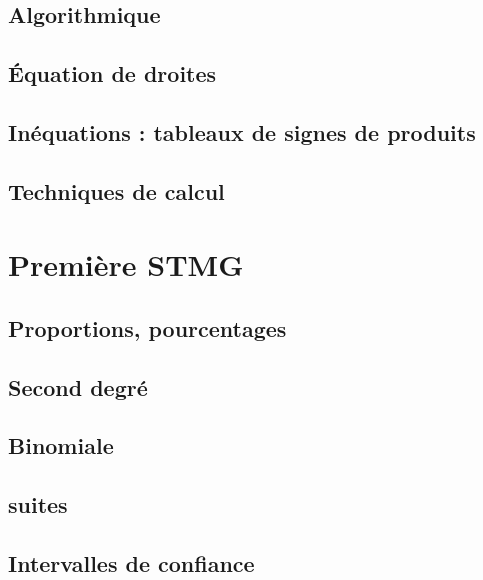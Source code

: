 \chapter{Algorithmique}


\chapter{Équation de droites}


\chapter{Inéquations : tableaux de signes de produits}


\chapter{Techniques de calcul}


\part{Première STMG}
\chapter{Proportions, pourcentages}


\chapter{Second degré}


\chapter{Binomiale}


\chapter{suites}


\chapter{Intervalles de confiance}



